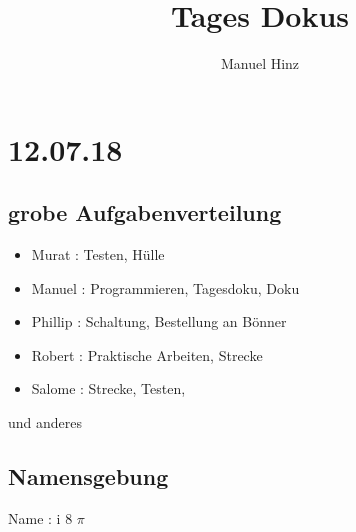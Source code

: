 \documentclass{article}
\author{Manuel Hinz}
\title{Tages Dokus}
\begin{document}
\maketitle

\section{12.07.18}

\subsection{grobe Aufgabenverteilung}

\begin{itemize}

\item Murat : Testen, H\"{u}lle

\item Manuel : Programmieren, Tagesdoku, Doku 

\item Phillip : Schaltung, Bestellung an B\"{o}nner

\item Robert : Praktische Arbeiten,  Strecke

\item Salome : Strecke, Testen,  

\end{itemize}

und anderes

\subsection{Namensgebung}

Name : i 8 $\pi$
\end{document}
